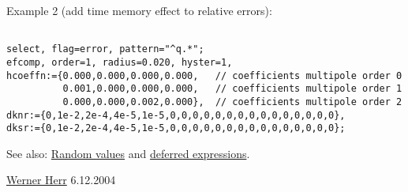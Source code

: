 Example 2 (add time memory effect to relative errors): 
\begin{verbatim}

select, flag=error, pattern="^q.*";
efcomp, order=1, radius=0.020, hyster=1,
hcoeffn:={0.000,0.000,0.000,0.000,   // coefficients multipole order 0
          0.001,0.000,0.000,0.000,   // coefficients multipole order 1
          0.000,0.000,0.002,0.000},  // coefficients multipole order 2
dknr:={0,1e-2,2e-4,4e-5,1e-5,0,0,0,0,0,0,0,0,0,0,0,0,0,0,0},
dksr:={0,1e-2,2e-4,4e-5,1e-5,0,0,0,0,0,0,0,0,0,0,0,0,0,0,0};
\end{verbatim}
 See also: \href{../Introduction/expression.html#random}{Random values} and \href{../Introduction/expression.html#defer}{deferred expressions}. 

\href{http://consult.cern.ch/xwho/people/1808}{Werner Herr}  6.12.2004 

